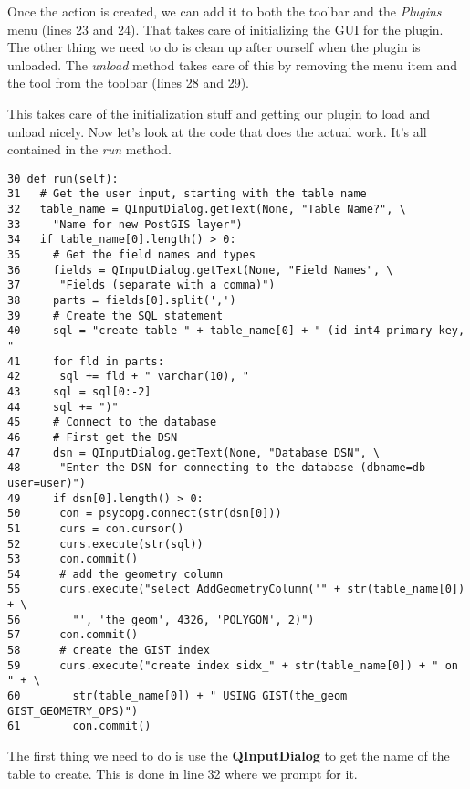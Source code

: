 Once the action is created, we can add it to both the toolbar and the \textsl{Plugins} menu (lines 23 and 24).
That takes care of initializing the GUI for the plugin.
The other thing we need to do is clean up after ourself when the plugin is unloaded.
The \textsl{unload} method takes care of this by removing the menu item and the tool from the toolbar (lines 28 and 29).

This takes care of the initialization stuff and getting our plugin to load and unload nicely.
Now let's look at the code that does the actual work.
It's all contained in the \textsl{run} method.

\begin{verbatim}
30 def run(self): 
31   # Get the user input, starting with the table name
32   table_name = QInputDialog.getText(None, "Table Name?", \
33     "Name for new PostGIS layer")
34   if table_name[0].length() > 0:
35     # Get the field names and types
36     fields = QInputDialog.getText(None, "Field Names", \
37      "Fields (separate with a comma)")
38     parts = fields[0].split(',')
39     # Create the SQL statement
40     sql = "create table " + table_name[0] + " (id int4 primary key, "
41     for fld in parts:
42      sql += fld + " varchar(10), "
43     sql = sql[0:-2]
44     sql += ")"
45     # Connect to the database
46     # First get the DSN
47     dsn = QInputDialog.getText(None, "Database DSN", \
48      "Enter the DSN for connecting to the database (dbname=db user=user)")
49     if dsn[0].length() > 0:
50      con = psycopg.connect(str(dsn[0]))
51      curs = con.cursor()
52      curs.execute(str(sql))
53      con.commit()
54      # add the geometry column
55      curs.execute("select AddGeometryColumn('" + str(table_name[0]) + \
56        "', 'the_geom', 4326, 'POLYGON', 2)")
57      con.commit()
58      # create the GIST index
59      curs.execute("create index sidx_" + str(table_name[0]) + " on " + \
60        str(table_name[0]) + " USING GIST(the_geom GIST_GEOMETRY_OPS)")
61        con.commit()
\end{verbatim}

The first thing we need to do is use the \textbf{QInputDialog} to get the name of the table to create.
This is done in line 32 where we prompt for it.


